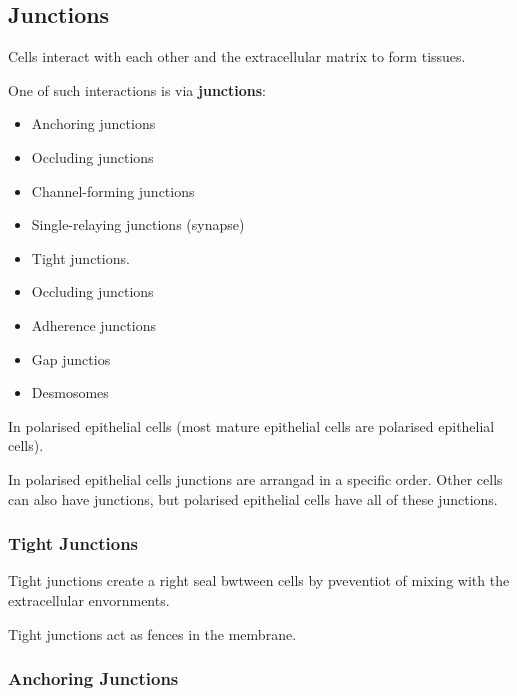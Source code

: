\documentclass[11pt]{scrartcl}
\begin{document}
\subsection{Junctions}

Cells interact with each other and the extracellular matrix to form
tissues.

One of such interactions is via \textbf{junctions}:
\begin{itemize}
\item Anchoring junctions
\item Occluding junctions
\item Channel-forming junctions
\item Single-relaying junctions (synapse)
\item Tight junctions.
\item Occluding junctions
\item Adherence junctions
\item Gap junctios
\item Desmosomes
\end{itemize}

In polarised epithelial cells (most mature epithelial cells are
polarised epithelial cells).

In polarised epithelial cells junctions are arrangad in a specific
order. Other cells can also have junctions, but polarised epithelial
cells have all of these junctions.

\subsubsection{Tight Junctions}

Tight junctions create a right seal bwtween cells by pveventiot of
mixing with the extracellular envornments.

Tight junctions act as fences in the membrane.





\subsubsection{Anchoring Junctions}
\end{document}
